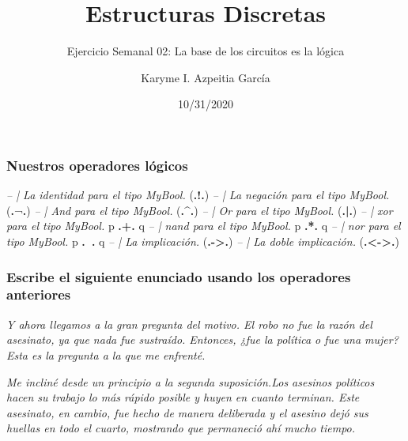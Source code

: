 \documentclass[
]{article}
\title{Estructuras Discretas}
\subtitle{Ejercicio Semanal 02: La base de los circuitos es la lógica}
\author{Karyme I. Azpeitia García}
\date{10/31/2020}
\newenvironment{Shaded}{\begin{snugshade}}{\end{snugshade}}
\newcommand{\CommentTok}[1]{\textcolor[rgb]{0.56,0.35,0.01}{\textit{#1}}}
\newcommand{\NormalTok}[1]{#1}
\newcommand{\OperatorTok}[1]{\textcolor[rgb]{0.81,0.36,0.00}{\textbf{#1}}}
\begin{document}
\maketitle

\hypertarget{nuestros-operadores-luxf3gicos}{%
\subsubsection{Nuestros operadores
lógicos}\label{nuestros-operadores-luxf3gicos}}

\begin{Shaded}
\begin{Highlighting}[]
\CommentTok{-- | La identidad para el tipo MyBool.}
\NormalTok{(}\OperatorTok{.!.}\NormalTok{)}
\CommentTok{-- | La negación para el tipo MyBool.}
\NormalTok{(}\OperatorTok{.}\NormalTok{¬}\OperatorTok{.}\NormalTok{)}
\CommentTok{-- | And para el tipo MyBool.}
\NormalTok{(}\OperatorTok{.^.}\NormalTok{)}
\CommentTok{-- | Or para el tipo MyBool.}
\NormalTok{(}\OperatorTok{.|.}\NormalTok{)}
\CommentTok{-- | xor para el tipo MyBool.}
\NormalTok{p }\OperatorTok{.+.}\NormalTok{ q}
\CommentTok{-- | nand para el tipo MyBool.}
\NormalTok{p }\OperatorTok{.*.}\NormalTok{ q }
\CommentTok{-- | nor para el tipo MyBool.}
\NormalTok{p }\OperatorTok{.~.}\NormalTok{ q}
\CommentTok{-- | La implicación.}
\NormalTok{(}\OperatorTok{.->.}\NormalTok{)}
\CommentTok{-- | La doble implicación.}
\NormalTok{(}\OperatorTok{.<->.}\NormalTok{)}
\end{Highlighting}
\end{Shaded}

\hypertarget{escribe-el-siguiente-enunciado-usando-los-operadores-anteriores}{%
\subsubsection{Escribe el siguiente enunciado usando los operadores
anteriores}\label{escribe-el-siguiente-enunciado-usando-los-operadores-anteriores}}

\emph{Y ahora llegamos a la gran pregunta del motivo. El robo no fue la
razón del asesinato, ya que nada fue sustraído. Entonces, ¿fue la
política o fue una mujer? Esta es la pregunta a la que me enfrenté.}

\emph{Me incliné desde un principio a la segunda suposición.Los asesinos
políticos hacen su trabajo lo más rápido posible y huyen en cuanto
terminan. Este asesinato, en cambio, fue hecho de manera deliberada y el
asesino dejó sus huellas en todo el cuarto, mostrando que permaneció ahí
mucho tiempo.}
\end{document}
